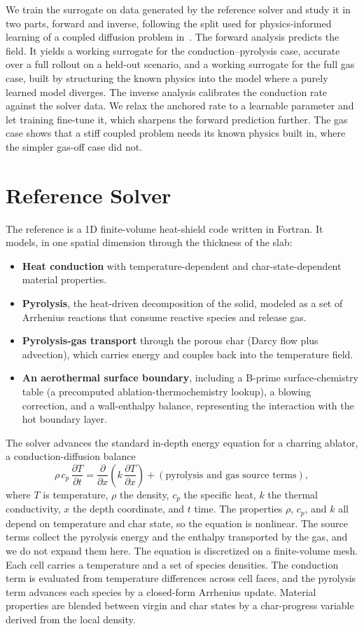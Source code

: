 \documentclass[conference]{IEEEtran}
\begin{document}
We train the surrogate on data generated by the reference solver and study it in
two parts, forward and inverse, following the split used for physics-informed
learning of a coupled diffusion problem in~\cite{cao2026}. The forward analysis
predicts the field. It yields a working surrogate for the conduction--pyrolysis
case, accurate over a full rollout on a held-out scenario, and a working surrogate
for the full gas case, built by structuring the known physics into the model where
a purely learned model diverges. The inverse analysis calibrates the conduction rate
against the solver data. We relax the anchored rate to a learnable parameter and let
training fine-tune it, which sharpens the forward prediction further. The gas case
shows that a stiff coupled problem needs its known physics built in, where the
simpler gas-off case did not.

\section{Reference Solver}
The reference is a 1D finite-volume heat-shield code written in Fortran. It models,
in one spatial dimension through the thickness of the slab:
\begin{itemize}
  \item \textbf{Heat conduction} with temperature-dependent and
  char-state-dependent material properties.
  \item \textbf{Pyrolysis}, the heat-driven decomposition of the solid, modeled as
  a set of Arrhenius reactions that consume reactive species and release gas.
  \item \textbf{Pyrolysis-gas transport} through the porous char (Darcy flow plus
  advection), which carries energy and couples back into the temperature field.
  \item \textbf{An aerothermal surface boundary}, including a B-prime
  surface-chemistry table (a precomputed ablation-thermochemistry lookup), a
  blowing correction, and a wall-enthalpy balance, representing the interaction
  with the hot boundary layer.
\end{itemize}
The solver advances the standard in-depth energy equation for a charring ablator,
a conduction-diffusion balance
\begin{equation}
\rho\, c_p\, \frac{\partial T}{\partial t}
  = \frac{\partial}{\partial x}\!\left(k\, \frac{\partial T}{\partial x}\right)
  + (\text{pyrolysis and gas source terms}),
\end{equation}
where $T$ is temperature, $\rho$ the density, $c_p$ the specific heat, $k$ the
thermal conductivity, $x$ the depth coordinate, and $t$ time. The properties
$\rho$, $c_p$, and $k$ all depend on temperature and char state, so the equation
is nonlinear. The source terms collect the pyrolysis energy and the enthalpy
transported by the gas, and we do not expand them here. The equation is
discretized on a finite-volume mesh. Each cell carries a temperature and a set of
species densities. The conduction term is evaluated from temperature differences
across cell faces, and the pyrolysis term advances each species by a closed-form
Arrhenius update. Material properties are blended between virgin and char states by
a char-progress variable derived from the local density.
\end{document}
